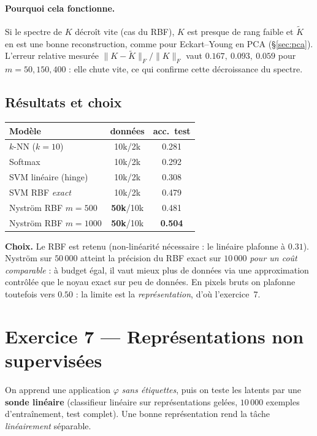 \documentclass[11pt,a4paper]{article}
\newcommand{\norm}[1]{\lVert #1 \rVert}
\begin{document}
\paragraph{Pourquoi cela fonctionne.} Si le spectre de $K$ décroît vite (cas du
RBF), $K$ est presque de rang faible et $\tilde K$ en est une bonne
reconstruction, comme pour Eckart–Young en PCA (\S\ref{sec:pca}). L'erreur
relative mesurée $\norm{K-\tilde K}_F/\norm{K}_F$ vaut $0.167,\ 0.093,\ 0.059$
pour $m=50,150,400$ : elle chute vite, ce qui confirme cette décroissance du
spectre.

\subsection{Résultats et choix}
\begin{center}
\begin{tabular}{lcc}
\toprule
Modèle & données & acc.\ test \\
\midrule
$k$-NN ($k{=}10$)        & 10k/2k & 0.281 \\
Softmax                  & 10k/2k & 0.292 \\
SVM linéaire (hinge)     & 10k/2k & 0.308 \\
SVM RBF \emph{exact}     & 10k/2k & 0.479 \\
Nyström RBF $m{=}500$    & \textbf{50k}/10k & 0.481 \\
Nyström RBF $m{=}1000$   & \textbf{50k}/10k & \textbf{0.504} \\
\bottomrule
\end{tabular}
\end{center}
\noindent\textbf{Choix.} Le RBF est retenu (non-linéarité nécessaire : le linéaire
plafonne à $0.31$). Nyström sur $50\,000$ atteint la précision du RBF exact sur
$10\,000$ \emph{pour un coût comparable} : à budget égal, il vaut mieux plus de
données via une approximation contrôlée que le noyau exact sur peu de données. En
pixels bruts on plafonne toutefois vers $0.50$ : la limite est la
\emph{représentation}, d'où l'exercice~7.

\section{Exercice 7 — Représentations non supervisées}
On apprend une application $\varphi$ \emph{sans étiquettes}, puis on teste les
latents par une \textbf{sonde linéaire} (classifieur linéaire sur représentations
gelées, $10\,000$ exemples d'entraînement, test complet). Une bonne représentation
rend la tâche \emph{linéairement} séparable.
\end{document}
